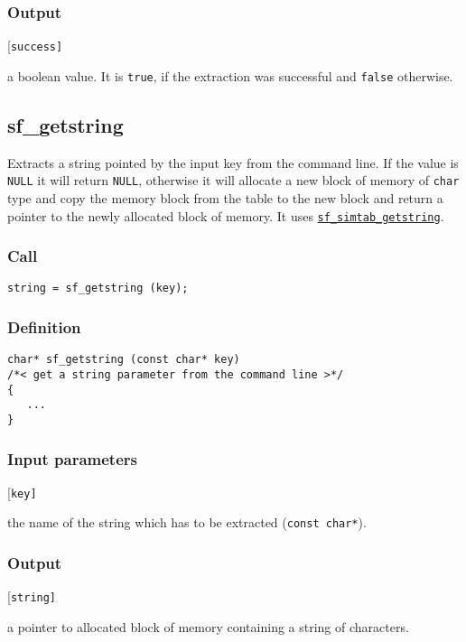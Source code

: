 \subsubsection*{Output}
\begin{desclist}{\tt }{\quad}[\tt success]
   \setlength\itemsep{0pt}
   \item[success]  a boolean value. It is \texttt{true}, if the extraction was successful and \texttt{false} otherwise.
\end{desclist}




\subsection{{sf\_getstring}}
Extracts a string pointed by the input key from the command line. If the value is \texttt{NULL} it will return \texttt{NULL}, otherwise it will allocate a new block of memory of \texttt{char} type and copy the memory block from the table to the new block and return a pointer to the newly allocated block of memory. It uses \hyperref[sec:sf_simtab_getstring]{\texttt{sf\_simtab\_getstring}}.

\subsubsection*{Call}
\begin{verbatim}string = sf_getstring (key);\end{verbatim}

\subsubsection*{Definition}
\begin{verbatim}
char* sf_getstring (const char* key) 
/*< get a string parameter from the command line >*/
{
   ...
}
\end{verbatim}

\subsubsection*{Input parameters}
\begin{desclist}{\tt }{\quad}[\tt key]
   \setlength\itemsep{0pt}
   \item[key] the name of the string which has to be extracted (\texttt{const char*}).
\end{desclist}

\subsubsection*{Output}
\begin{desclist}{\tt }{\quad}[\tt string]
   \setlength\itemsep{0pt}
   \item[string] a pointer to allocated block of memory containing a string of characters. 
\end{desclist}




